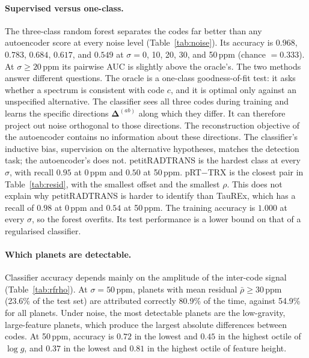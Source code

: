 \paragraph{Supervised versus one-class.}
The three-class random forest separates the codes far better than any autoencoder score at every noise level (Table~\ref{tab:noise}).
Its accuracy is $0.968$, $0.783$, $0.684$, $0.617$, and $0.549$ at $\sigma=0$, 10, 20, 30, and 50\,ppm (chance $=0.333$).
At $\sigma\geq20\,\mathrm{ppm}$ its pairwise AUC is slightly above the oracle's.
The two methods answer different questions.
The oracle is a one-class goodness-of-fit test: it asks whether a spectrum is consistent with code $c$, and it is optimal only against an unspecified alternative.
The classifier sees all three codes during training and learns the specific directions $\bm{\Delta}^{(ab)}$ along which they differ.
It can therefore project out noise orthogonal to those directions.
The reconstruction objective of the autoencoder contains no information about these directions.
The classifier's inductive bias, supervision on the alternative hypotheses, matches the detection task; the autoencoder's does not.
petitRADTRANS is the hardest class at every $\sigma$, with recall $0.95$ at 0\,ppm and $0.50$ at 50\,ppm.
pRT$-$TRX is the closest pair in Table~\ref{tab:resid}, with the smallest offset and the smallest $\rho$.
This does not explain why petitRADTRANS is harder to identify than TauREx, which has a recall of $0.98$ at 0\,ppm and $0.54$ at 50\,ppm.
The training accuracy is $1.000$ at every $\sigma$, so the forest overfits.
Its test performance is a lower bound on that of a regularised classifier.

\paragraph{Which planets are detectable.}
Classifier accuracy depends mainly on the amplitude of the inter-code signal (Table~\ref{tab:rfrho}).
At $\sigma=50\,\mathrm{ppm}$, planets with mean residual $\bar\rho\geq30\,\mathrm{ppm}$ (23.6\% of the test set) are attributed correctly 80.9\% of the time, against 54.9\% for all planets.
Under noise, the most detectable planets are the low-gravity, large-feature planets, which produce the largest absolute differences between codes.
At 50\,ppm, accuracy is $0.72$ in the lowest and $0.45$ in the highest octile of $\log g$, and $0.37$ in the lowest and $0.81$ in the highest octile of feature height.

